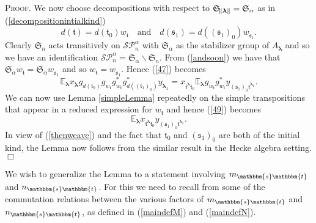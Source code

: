 \documentclass[10pt,a4,twoside,hidelinks,rm]{article}
\newcommand\es{\mathbbm{s}}
\newcommand\et{\mathbbm{t}}
\newcommand{\bT}{\pmb{\mathfrak{t}}}
\newcommand{\Bs}{\pmb{\mathfrak{s}}}
\newcommand{\Si}{\mathfrak{S}}
\newcommand\blambda{{\boldsymbol\lambda}}
\newcommand\be{\mathbb{E}}
\theoremstyle{plain}
\newenvironment{demo}
{\textsc{Proof.}} {\quad \hfill $\Box$}
\begin{document}
\begin{demo}
We now choose decompositions with respect to $ \Si_{  \norm{\blambda} } = \Si_{\alpha} $
as in (\ref{decompositionintialkind})
\begin{equation}
 d(\bT ) = d(\bT_0) w_{\bT} \, \, \, \, \, \, \mbox{and} \, \, \, \, \, \,
 d(\Bs_1 ) = d((\Bs_1)_0) w_{\Bs_1}.
\end{equation}
Clearly $ \Si_n $ acts transitively on $ \mathcal{SP}_n^{\alpha} $
with $ \Si_{\alpha} $ as the stabilizer group of $ A_{\blambda}$ and so we have an identification
$ \mathcal{SP}_n^{\alpha} = \Si_{\alpha} \backslash \Si_n $. 
From (\ref{andsoon}) we have that 
$ \Si_{\alpha} w_{\bT} = \Si_{\alpha} w_{\Bs_1} $ and so 
$  w_{\bT} = w_{\Bs_1} $.
Hence (\ref{47}) becomes
\begin{equation}\label{49}
 \be^{}_{\blambda} x^{}_{\blambda} g^{}_{d(\bT_0)} g^{}_{  w_{\bT} } g^{\ast}_{  w_{\bT} } 
 g_{d( (\bT_1)_0)}^{\ast}     y^{}_{\blambda_1} = 
  x^{}_{\bT^{\blambda}  \bT_0} \be^{}_{\blambda} g^{}_{  w_{\bT} } g^{\ast}_{  w_{\bT} } 
y^{}_{  (\Bs_1)_0   \bT^{\blambda_1 }}.
 \end{equation}
We can now use Lemma {\ref{simpleLemma}} repeatedly on the simple transpositions that appear in a 
reduced expression for 
$  w_{\bT} $ and hence (\ref{49}) becomes
\begin{equation}
 \be^{}_{\blambda}
 x^{}_{\bT^{\blambda}  \bT_0} y^{}_{  (\Bs_1)_0   \bT^{\blambda_1 }}.
\end{equation}
In view of (\ref{thenweave}) and the fact that 
$ \bT_0 $ and $ (\Bs_1)_0 $ are both of the initial kind, 
the Lemma now follows from the similar result in the Hecke algebra setting.
\end{demo}  

\medskip
We wish to generalize the Lemma to a statement involving
$ m_{\es\et} $ and $ n_{\es\et}$. For this we need to recall from \cite{ER} some of the commutation relations
between the various factors of $ m_{\es\et} $ and $ n_{\es\et}$, as defined in
(\ref{maindefM}) and (\ref{maindefN}).
\end{document}
